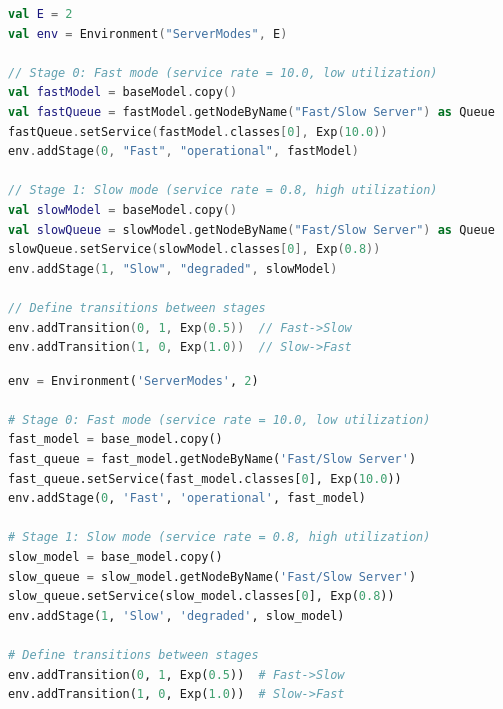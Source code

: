 \begin{KOTLIN}
\begin{lstlisting}[language = kotlin, basicstyle=\ttfamily\scriptsize]
val E = 2
val env = Environment("ServerModes", E)

// Stage 0: Fast mode (service rate = 10.0, low utilization)
val fastModel = baseModel.copy()
val fastQueue = fastModel.getNodeByName("Fast/Slow Server") as Queue
fastQueue.setService(fastModel.classes[0], Exp(10.0))
env.addStage(0, "Fast", "operational", fastModel)

// Stage 1: Slow mode (service rate = 0.8, high utilization)
val slowModel = baseModel.copy()
val slowQueue = slowModel.getNodeByName("Fast/Slow Server") as Queue
slowQueue.setService(slowModel.classes[0], Exp(0.8))
env.addStage(1, "Slow", "degraded", slowModel)

// Define transitions between stages
env.addTransition(0, 1, Exp(0.5))  // Fast->Slow
env.addTransition(1, 0, Exp(1.0))  // Slow->Fast
\end{lstlisting}
\end{KOTLIN}
\begin{PYTHON}
\begin{lstlisting}[language = python]
env = Environment('ServerModes', 2)

# Stage 0: Fast mode (service rate = 10.0, low utilization)
fast_model = base_model.copy()
fast_queue = fast_model.getNodeByName('Fast/Slow Server')
fast_queue.setService(fast_model.classes[0], Exp(10.0))
env.addStage(0, 'Fast', 'operational', fast_model)

# Stage 1: Slow mode (service rate = 0.8, high utilization)
slow_model = base_model.copy()
slow_queue = slow_model.getNodeByName('Fast/Slow Server')
slow_queue.setService(slow_model.classes[0], Exp(0.8))
env.addStage(1, 'Slow', 'degraded', slow_model)

# Define transitions between stages
env.addTransition(0, 1, Exp(0.5))  # Fast->Slow
env.addTransition(1, 0, Exp(1.0))  # Slow->Fast
\end{lstlisting}
\end{PYTHON}

